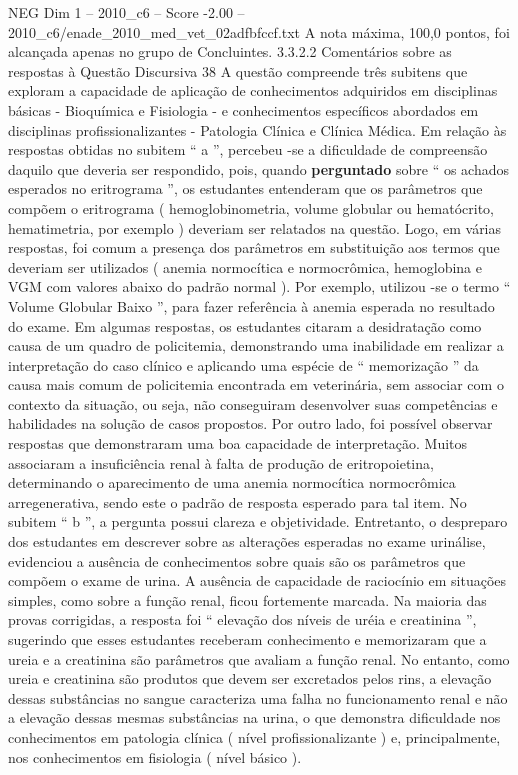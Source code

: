 \begin{textsample}{NEG Dim 1 – 2010\_c6 – Score -2.00 – 2010\_c6/enade\_2010\_med\_vet\_02adfbfccf.txt}
A nota máxima, 100,0 pontos, foi alcançada apenas no grupo de Concluintes. 3.3.2.2 Comentários sobre as respostas à Questão Discursiva 38 A questão compreende três subitens que exploram a capacidade de aplicação de conhecimentos adquiridos em disciplinas básicas - Bioquímica e Fisiologia - e conhecimentos específicos abordados em disciplinas profissionalizantes - Patologia Clínica e Clínica Médica.
Em relação às respostas obtidas no subitem “ a ”, percebeu -se a dificuldade de compreensão daquilo que deveria ser respondido, pois, quando \textbf{perguntado} sobre “ os achados esperados no eritrograma ”, os estudantes entenderam que os parâmetros que compõem o eritrograma ( hemoglobinometria, volume globular ou hematócrito, hematimetria, por exemplo ) deveriam ser relatados na questão.
Logo, em várias respostas, foi comum a presença dos parâmetros em substituição aos termos que deveriam ser utilizados ( anemia normocítica e normocrômica, hemoglobina e VGM com valores abaixo do padrão normal ).
Por exemplo, utilizou -se o termo “ Volume Globular Baixo ”, para fazer referência à anemia esperada no resultado do exame.
Em algumas respostas, os estudantes citaram a desidratação como causa de um quadro de policitemia, demonstrando uma inabilidade em realizar a interpretação do caso clínico e aplicando uma espécie de “ memorização ” da causa mais comum de policitemia encontrada em veterinária, sem associar com o contexto da situação, ou seja, não conseguiram desenvolver suas competências e habilidades na solução de casos propostos.
Por outro lado, foi possível observar respostas que demonstraram uma boa capacidade de interpretação.
Muitos associaram a insuficiência renal à falta de produção de eritropoietina, determinando o aparecimento de uma anemia normocítica normocrômica arregenerativa, sendo este o padrão de resposta esperado para tal item.
No subitem “ b ”, a pergunta possui clareza e objetividade.
Entretanto, o despreparo dos estudantes em descrever sobre as alterações esperadas no exame urinálise, evidenciou a ausência de conhecimentos sobre quais são os parâmetros que compõem o exame de urina.
A ausência de capacidade de raciocínio em situações simples, como sobre a função renal, ficou fortemente marcada.
Na maioria das provas corrigidas, a resposta foi “ elevação dos níveis de uréia e creatinina ”, sugerindo que esses estudantes receberam conhecimento e memorizaram que a ureia e a creatinina são parâmetros que avaliam a função renal.
No entanto, como ureia e creatinina são produtos que devem ser excretados pelos rins, a elevação dessas substâncias no sangue caracteriza uma falha no funcionamento renal e não a elevação dessas mesmas substâncias na urina, o que demonstra dificuldade nos conhecimentos em patologia clínica ( nível profissionalizante ) e, principalmente, nos conhecimentos em fisiologia ( nível básico ).

\end{textsample}
